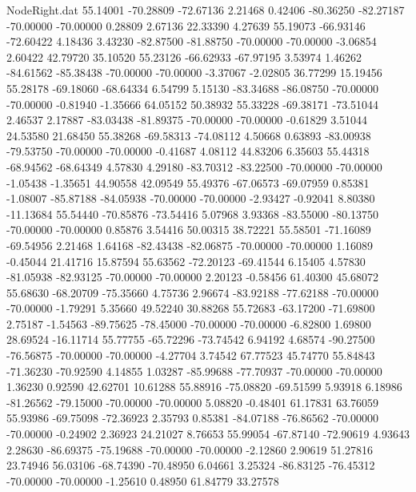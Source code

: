 \begin{filecontents}{NodeRight.dat}
  55.14001  -70.28809  -72.67136     2.21468    0.42406  -80.36250  -82.27187  -70.00000  -70.00000    0.28809    2.67136   22.33390    4.27639
  55.19073  -66.93146  -72.60422     4.18436    3.43230  -82.87500  -81.88750  -70.00000  -70.00000   -3.06854    2.60422   42.79720   35.10520
  55.23126  -66.62933  -67.97195     3.53974    1.46262  -84.61562  -85.38438  -70.00000  -70.00000   -3.37067   -2.02805   36.77299   15.19456
  55.28178  -69.18060  -68.64334     6.54799    5.15130  -83.34688  -86.08750  -70.00000  -70.00000   -0.81940   -1.35666   64.05152   50.38932
  55.33228  -69.38171  -73.51044     2.46537    2.17887  -83.03438  -81.89375  -70.00000  -70.00000   -0.61829    3.51044   24.53580   21.68450
  55.38268  -69.58313  -74.08112     4.50668    0.63893  -83.00938  -79.53750  -70.00000  -70.00000   -0.41687    4.08112   44.83206    6.35603
  55.44318  -68.94562  -68.64349     4.57830    4.29180  -83.70312  -83.22500  -70.00000  -70.00000   -1.05438   -1.35651   44.90558   42.09549
  55.49376  -67.06573  -69.07959     0.85381   -1.08007  -85.87188  -84.05938  -70.00000  -70.00000   -2.93427   -0.92041    8.80380  -11.13684
  55.54440  -70.85876  -73.54416     5.07968    3.93368  -83.55000  -80.13750  -70.00000  -70.00000    0.85876    3.54416   50.00315   38.72221
  55.58501  -71.16089  -69.54956     2.21468    1.64168  -82.43438  -82.06875  -70.00000  -70.00000    1.16089   -0.45044   21.41716   15.87594
  55.63562  -72.20123  -69.41544     6.15405    4.57830  -81.05938  -82.93125  -70.00000  -70.00000    2.20123   -0.58456   61.40300   45.68072
  55.68630  -68.20709  -75.35660     4.75736    2.96674  -83.92188  -77.62188  -70.00000  -70.00000   -1.79291    5.35660   49.52240   30.88268
  55.72683  -63.17200  -71.69800     2.75187   -1.54563  -89.75625  -78.45000  -70.00000  -70.00000   -6.82800    1.69800   28.69524  -16.11714
  55.77755  -65.72296  -73.74542     6.94192    4.68574  -90.27500  -76.56875  -70.00000  -70.00000   -4.27704    3.74542   67.77523   45.74770
  55.84843  -71.36230  -70.92590     4.14855    1.03287  -85.99688  -77.70937  -70.00000  -70.00000    1.36230    0.92590   42.62701   10.61288
  55.88916  -75.08820  -69.51599     5.93918    6.18986  -81.26562  -79.15000  -70.00000  -70.00000    5.08820   -0.48401   61.17831   63.76059
  55.93986  -69.75098  -72.36923     2.35793    0.85381  -84.07188  -76.86562  -70.00000  -70.00000   -0.24902    2.36923   24.21027    8.76653
  55.99054  -67.87140  -72.90619     4.93643    2.28630  -86.69375  -75.19688  -70.00000  -70.00000   -2.12860    2.90619   51.27816   23.74946
  56.03106  -68.74390  -70.48950     6.04661    3.25324  -86.83125  -76.45312  -70.00000  -70.00000   -1.25610    0.48950   61.84779   33.27578

\end{filecontents}
